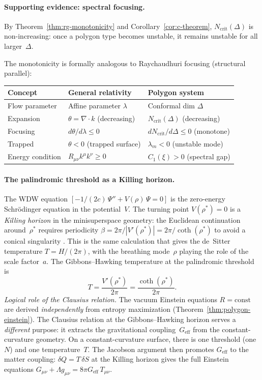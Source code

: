 \paragraph{Supporting evidence: spectral focusing.}
By Theorem~\ref{thm:rg-monotonicity} and
Corollary~\ref{cor:c-theorem},
$N_{\mathrm{crit}}(\Delta)$ is non-increasing:
once a polygon type becomes unstable,
it remains unstable for all larger~$\Delta$.

\noindent
The monotonicity is formally analogous to
Raychaudhuri focusing (structural parallel):
\begin{center}
\small
\begin{tabular}{lll}
\toprule
Concept & General relativity & Polygon system \\
\midrule
Flow parameter & Affine parameter $\lambda$ & Conformal dim $\Delta$ \\
Expansion & $\theta = \nabla \cdot k$ (decreasing) &
  $N_{\mathrm{crit}}(\Delta)$ (decreasing) \\
Focusing & $d\theta/d\lambda \le 0$ &
  $dN_{\mathrm{crit}}/d\Delta \le 0$ (monotone) \\
Trapped & $\theta < 0$ (trapped surface) &
  $\lambda_m < 0$ (unstable mode) \\
Energy condition & $R_{\mu\nu}k^\mu k^\nu \ge 0$ &
  $C_1(\xi) > 0$ (spectral gap) \\
\bottomrule
\end{tabular}
\end{center}

\paragraph{The palindromic threshold as a Killing horizon.}
The WDW equation
$[-1/(2c)\,\Psi'' + V(\rho)\,\Psi = 0]$
is the zero-energy Schr\"odinger equation in the potential~$V$.
The turning point $V(\rho^*) = 0$ is a \emph{Killing horizon}
in the minisuperspace geometry: the Euclidean continuation
around~$\rho^*$ requires periodicity
$\beta = 2\pi/|V'(\rho^*)| = 2\pi/\coth(\rho^*)$
to avoid a conical singularity
\citep{GibbonsHawking1977}.
This is the same calculation that gives the de~Sitter temperature
$T = H/(2\pi)$, with the breathing mode~$\rho$ playing the
role of the scale factor~$a$.
The Gibbons--Hawking temperature at the palindromic threshold is
\begin{equation}\label{eq:T-GH}
  T = \frac{V'(\rho^*)}{2\pi} = \frac{\coth(\rho^*)}{2\pi}.
\end{equation}
\emph{Logical role of the Clausius relation.}
The vacuum Einstein equations $R = \mathrm{const}$ are derived
\emph{independently} from entropy maximization
(Theorem~\ref{thm:polygon-einstein}).
The Clausius relation at the Gibbons--Hawking horizon
serves a \emph{different} purpose: it extracts the
gravitational coupling~$G_{\mathrm{eff}}$ from the
constant-curvature geometry.
On a constant-curvature surface, there is one threshold
(one~$N$) and one temperature~$T$.
The Jacobson argument \citep{Jacobson1995,Lashkari2014}
then promotes $G_{\mathrm{eff}}$ to the matter coupling:
$\delta Q = T\,\delta S$ at the Killing horizon gives
the full Einstein equations $G_{\mu\nu} + \Lambda g_{\mu\nu}
= 8\pi G_{\mathrm{eff}}\,T_{\mu\nu}$.

